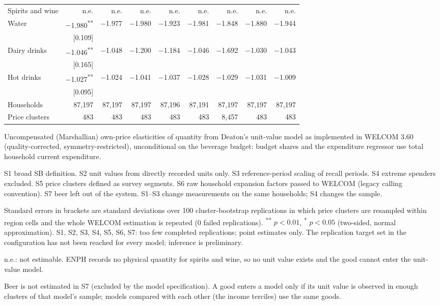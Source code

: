 \documentclass[
  11pt,
]{article}
\begin{document}
\begin{table}[!htbp]
\begin{threeparttable}
\begin{tabular}{lrrrrrrrr}
Spirits and wine & n.e. & n.e. & n.e. & n.e. & n.e. & n.e. & n.e. & n.e. \\
Water & $-$1.980\textsuperscript{**} & $-$1.977 & $-$1.980 & $-$1.923 & $-$1.981 & $-$1.848 & $-$1.880 & $-$1.944 \\
 & [0.109] &  &  &  &  &  &  &  \\
Dairy drinks & $-$1.046\textsuperscript{**} & $-$1.048 & $-$1.200 & $-$1.184 & $-$1.046 & $-$1.692 & $-$1.030 & $-$1.043 \\
 & [0.165] &  &  &  &  &  &  &  \\
Hot drinks & $-$1.027\textsuperscript{**} & $-$1.024 & $-$1.041 & $-$1.037 & $-$1.028 & $-$1.029 & $-$1.031 & $-$1.009 \\
 & [0.095] &  &  &  &  &  &  &  \\
\addlinespace
Households & 87,197 & 87,197 & 87,197 & 87,196 & 87,191 & 87,197 & 87,197 & 87,197 \\
Price clusters & 483 & 483 & 483 & 483 & 483 & 8,457 & 483 & 483 \\
\bottomrule
\end{tabular}
\begin{tablenotes}[flushleft]
\footnotesize
\item Uncompensated (Marshallian) own-price elasticities of quantity from Deaton's unit-value model as implemented in WELCOM 3.60 (quality-corrected, symmetry-restricted), unconditional on the beverage budget: budget shares and the expenditure regressor use total household current expenditure.
\item S1 broad SB definition. S2 unit values from directly recorded units only. S3 reference-period scaling of recall periods. S4 extreme spenders excluded. S5 price clusters defined as survey segments. S6 raw household expansion factors passed to WELCOM (legacy calling convention). S7 beer left out of the system. S1--S3 change measurements on the same households; S4 changes the sample.
\item Standard errors in brackets are standard deviations over 100 cluster-bootstrap replications in which price clusters are resampled within region cells and the whole WELCOM estimation is repeated (0 failed replications). \textsuperscript{**} $p<0.01$, \textsuperscript{*} $p<0.05$ (two-sided, normal approximation). S1, S2, S3, S4, S5, S6, S7: too few completed replications; point estimates only. The replication target set in the configuration has not been reached for every model; inference is preliminary.
\item n.e.: not estimable. ENPH records no physical quantity for spirits and wine, so no unit value exists and the good cannot enter the unit-value model.
\item Beer is not estimated in S7 (excluded by the model specification). A good enters a model only if its unit value is observed in enough clusters of that model's sample; models compared with each other (the income terciles) use the same goods.
\end{tablenotes}
\end{threeparttable}
\end{table}
\end{document}
